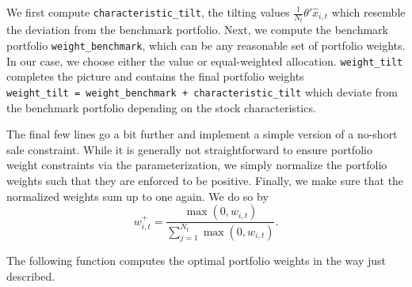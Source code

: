 \documentclass[
]{book}
\begin{document}
We first compute \texttt{characteristic\_tilt}, the tilting values \(\frac{1}{N_t}\theta'\hat{x}_{i, t}\) which resemble the deviation from the benchmark portfolio. Next, we compute the benchmark portfolio \texttt{weight\_benchmark}, which can be any reasonable set of portfolio weights. In our case, we choose either the value or equal-weighted allocation.
\texttt{weight\_tilt} completes the picture and contains the final portfolio weights \texttt{weight\_tilt\ =\ weight\_benchmark\ +\ characteristic\_tilt} which deviate from the benchmark portfolio depending on the stock characteristics.

The final few lines go a bit further and implement a simple version of a no-short sale constraint. While it is generally not straightforward to ensure portfolio weight constraints via the parameterization, we simply normalize the portfolio weights such that they are enforced to be positive. Finally, we make sure that the normalized weights sum up to one again. We do so by\\
\[w_{i,t}^+ = \frac{\max(0, w_{i,t})}{\sum\limits_{j=1}^{N_t}\max(0, w_{i,t})}.\]

The following function computes the optimal portfolio weights in the way just described.
\end{document}
